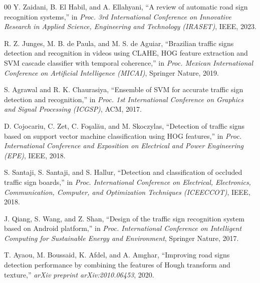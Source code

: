 \documentclass[conference]{IEEEtran}
\begin{document}
\begin{thebibliography}{00}
Y. Zaidani, B. El Habil, and A. Ellahyani, ``A review of automatic road sign recognition systems,'' in \emph{Proc. 3rd International Conference on Innovative Research in Applied Science, Engineering and Technology (IRASET)}, IEEE, 2023.

R. Z. Junges, M. B. de Paula, and M. S. de Aguiar, ``Brazilian traffic signs detection and recognition in videos using CLAHE, HOG feature extraction and SVM cascade classifier with temporal coherence,'' in \emph{Proc. Mexican International Conference on Artificial Intelligence (MICAI)}, Springer Nature, 2019.

S. Agrawal and R. K. Chaurasiya, ``Ensemble of SVM for accurate traffic sign detection and recognition,'' in \emph{Proc. 1st International Conference on Graphics and Signal Processing (ICGSP)}, ACM, 2017.

D. Cojocariu, C. Zet, C. Fo\c{s}al\u{a}u, and M. Skoczylas, ``Detection of traffic signs based on support vector machine classification using HOG features,'' in \emph{Proc. International Conference and Exposition on Electrical and Power Engineering (EPE)}, IEEE, 2018.

S. Santaji, S. Santaji, and S. Hallur, ``Detection and classification of occluded traffic sign boards,'' in \emph{Proc. International Conference on Electrical, Electronics, Communication, Computer, and Optimization Techniques (ICEECCOT)}, IEEE, 2018.

J. Qiang, S. Wang, and Z. Shan, ``Design of the traffic sign recognition system based on Android platform,'' in \emph{Proc. International Conference on Intelligent Computing for Sustainable Energy and Environment}, Springer Nature, 2017.

T. Ayaou, M. Boussaid, K. Afdel, and A. Amghar, ``Improving road signs detection performance by combining the features of Hough transform and texture,'' \emph{arXiv preprint arXiv:2010.06453}, 2020.

\end{thebibliography}
\end{document}
